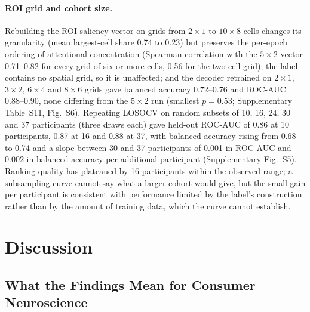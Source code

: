\documentclass[pdflatex,sn-basic,Numbered,twocolumn,iicol]{sn-jnl}
\theoremstyle{thmstyleone}%
\theoremstyle{thmstyletwo}%
\theoremstyle{thmstylethree}%
\begin{document}
\paragraph{ROI grid and cohort size.} Rebuilding the ROI saliency vector on grids from $2\times1$ to $10\times8$ cells changes its granularity (mean largest-cell share 0.74 to 0.23) but preserves the per-epoch ordering of attentional concentration (Spearman correlation with the $5\times2$ vector 0.71--0.82 for every grid of six or more cells, 0.56 for the two-cell grid); the label contains no spatial grid, so it is unaffected; and the decoder retrained on $2\times1$, $3\times2$, $6\times4$ and $8\times6$ grids gave balanced accuracy 0.72--0.76 and ROC-AUC 0.88--0.90, none differing from the $5\times2$ run (smallest $p=0.53$; Supplementary Table~S11, Fig.~S6). Repeating LOSOCV on random subsets of 10, 16, 24, 30 and 37 participants (three draws each) gave held-out ROC-AUC of 0.86 at 10 participants, 0.87 at 16 and 0.88 at 37, with balanced accuracy rising from 0.68 to 0.74 and a slope between 30 and 37 participants of 0.001 in ROC-AUC and 0.002 in balanced accuracy per additional participant (Supplementary Fig.~S5). Ranking quality has plateaued by 16 participants within the observed range; a subsampling curve cannot say what a larger cohort would give, but the small gain per participant is consistent with performance limited by the label's construction rather than by the amount of training data, which the curve cannot establish.

\section{Discussion}\label{sec:discussion}

\subsection{What the Findings Mean for Consumer Neuroscience}\label{disc:meaning}
\end{document}
